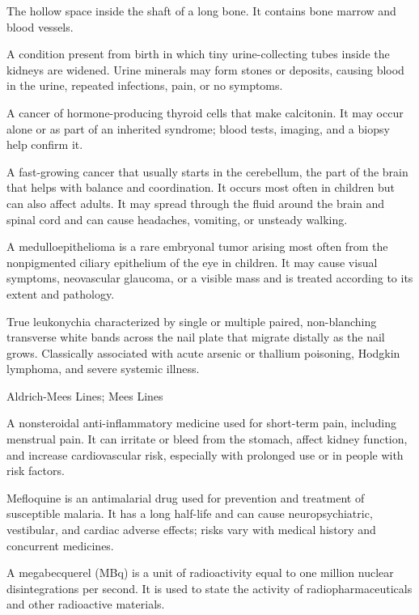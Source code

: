  The hollow space inside the shaft of a long bone. It contains bone marrow and blood vessels.

 A condition present from birth in which tiny urine-collecting tubes inside the kidneys are widened. Urine minerals may form stones or deposits, causing blood in the urine, repeated infections, pain, or no symptoms.

 A cancer of hormone-producing thyroid cells that make calcitonin. It may occur alone or as part of an inherited syndrome; blood tests, imaging, and a biopsy help confirm it.

 A fast-growing cancer that usually starts in the
cerebellum, the part of the brain that helps with balance and coordination. It
occurs most often in children but can also affect adults. It may spread through
the fluid around the brain and spinal cord and can cause headaches, vomiting,
or unsteady walking.

 A medulloepithelioma is a rare embryonal tumor arising most often from the nonpigmented ciliary epithelium of the eye in children. It may cause visual symptoms, neovascular glaucoma, or a visible mass and is treated according to its extent and pathology.

 True leukonychia characterized by single or multiple paired, non-blanching transverse white bands across the nail plate that migrate distally as the nail grows. Classically associated with acute arsenic or thallium poisoning, Hodgkin lymphoma, and severe systemic illness.

\synonyms
Aldrich-Mees Lines; Mees Lines

 A nonsteroidal anti-inflammatory medicine used for short-term pain, including menstrual pain. It can irritate or bleed from the stomach, affect kidney function, and increase cardiovascular risk, especially with prolonged use or in people with risk factors.

 Mefloquine is an antimalarial drug used for prevention and treatment of susceptible malaria. It has a long half-life and can cause neuropsychiatric, vestibular, and cardiac adverse effects; risks vary with medical history and concurrent medicines.

 A megabecquerel (MBq) is a unit of radioactivity equal to one million nuclear disintegrations per second. It is used to state the activity of radiopharmaceuticals and other radioactive materials.

